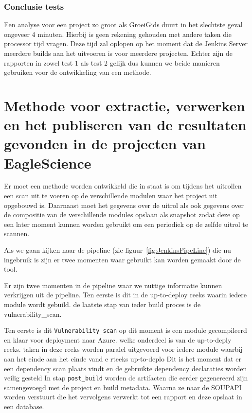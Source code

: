 \subsubsection{Conclusie tests}
Een analyse voor een project zo groot als GroeiGids duurt in het slechtste geval ongeveer 4 minuten. Hierbij is geen rekening gehouden met andere taken die processor tijd vragen. Deze tijd zal oplopen op het moment dat de Jenkins Server meerdere builds aan het uitvoeren is voor meerdere projecten. Echter zijn de rapporten in zowel test 1 als test 2 gelijk dus kunnen we beide manieren gebruiken voor de ontwikkeling van een methode.

\newpage


\section{Methode voor extractie, verwerken en het publiseren van de resultaten gevonden in de projecten van EagleScience}\label{subsec:methodeSOUPES}

Er moet een methode worden ontwikkeld die in staat is om tijdens het uitrollen een scan uit te voeren op de verschillende modulen waar het project uit opgebouwd is. Daarnaast moet het gegevens over de uitrol als ook gegevens over de compositie van de verschillende modules opslaan als snapshot zodat deze op een later moment kunnen worden gebruikt om een periodiek op de zelfde uitrol te scannen.

Als we gaan kijken naar de pipeline (zie figuur~\ref{fig:JenkinsPipeLine}) die nu ingebruik is zijn er twee momenten waar gebruikt kan worden gemaakt door de tool.

Er zijn twee momenten in de pipeline waar we nuttige informatie kunnen verkrijgen uit de pipeline. Ten eerste is dit in de up-to-deploy reeks waarin iedere module wordt gebuild. de laatste stap van ieder build proces is de vulnerability_scan.



Ten eerste is dit \texttt{Vulnerability\_scan} op dit moment is een module gecompileerd en klaar voor deployment naar Azure.  welke onderdeel is van de up-to-deply reeks. taken in deze reeks worden paralel uitgevoerd voor iedere module waarbij aan het einde  aan het einde vand e rteeks up-to-deplo Dit is het moment dat er een dependency scan plaats vindt en de gebruikte dependency declaraties worden veilig gesteld In stap \texttt{post\_build} worden de artifacten die eerder gegenereerd zijn samengevoegd met de project en build metadata. Waarna ze naar de SOUPAPI worden verstuurt die het vervolgens verwerkt tot een rapport en deze opslaat in een database.

